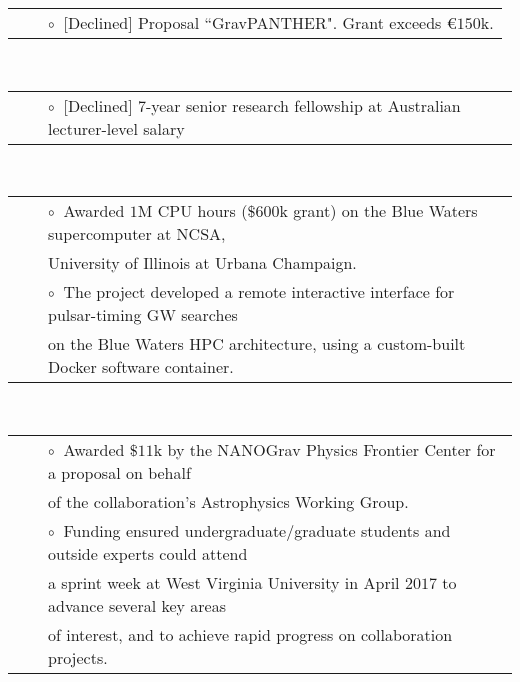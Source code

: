 \documentclass[11pt,letterpaper,sans]{moderncv}
\begin{document}
\begin{tabular}{rcl}
&\hspace{0.4cm} &{\color{color1} $\circ\;\;$}[Declined] Proposal ``GravPANTHER". Grant exceeds \euro$150$k.
\end{tabular} \\
\begin{tabular}{rcl}
&\hspace{0.4cm} &{\color{color1} $\circ\;\;$}[Declined] $7$-year senior research fellowship at Australian lecturer-level salary 
\end{tabular} \\
\begin{tabular}{rcl}
&\hspace{0.4cm} &{\color{color1} $\circ\;\;$}Awarded $1$M CPU hours ($\$600$k grant) on the Blue Waters supercomputer at NCSA, \\
&\hspace{0.4cm} &  \hspace{0.4cm}University of Illinois at Urbana Champaign. \\
&\hspace{0.4cm} &{\color{color1} $\circ\;\;$}The project developed a remote interactive interface for pulsar-timing GW searches \\
&\hspace{0.4cm} &  \hspace{0.4cm}on the Blue Waters HPC architecture, using a custom-built Docker software container.
\end{tabular} \\
\begin{tabular}{rcl}
&\hspace{0.4cm} &{\color{color1} $\circ\;\;$}Awarded $\$11$k by the NANOGrav Physics Frontier Center for a proposal on behalf \\
&\hspace{0.4cm} &  \hspace{0.4cm}of the collaboration's Astrophysics Working Group. \\
&\hspace{0.4cm} &{\color{color1} $\circ\;\;$}Funding ensured undergraduate/graduate students and outside experts could attend \\
&\hspace{0.4cm} &  \hspace{0.4cm}a sprint week at West Virginia University in April $2017$ to advance several key areas \\
&\hspace{0.4cm} &  \hspace{0.4cm}of interest, and to achieve rapid progress on collaboration projects. 
\end{tabular} \\
\end{document}
